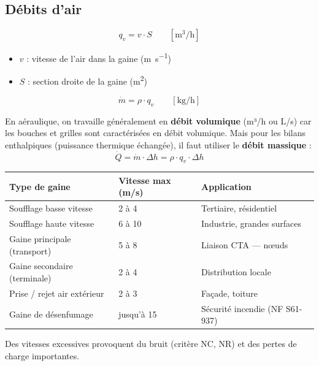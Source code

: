 \subsection{Débits d'air}

\begin{definition}[title=Débit volumique d'air]
\begin{equation}
  q_v = v \cdot S \qquad \left[\si{\cubic\metre\per\hour}\right]
\end{equation}
\begin{itemize}
  \item $v$ : vitesse de l'air dans la gaine (\si{\metre\per\second})
  \item $S$ : section droite de la gaine (\si{\square\metre})
\end{itemize}
\end{definition}

\begin{definition}[title=Débit massique d'air]
\begin{equation}
  \dot{m} = \rho \cdot q_v \qquad \left[\si{\kilogram\per\hour}\right]
\end{equation}
\end{definition}

\begin{attention}
En aéraulique, on travaille généralement en \textbf{débit volumique} (m³/h ou L/s) car les bouches et grilles sont caractérisées en débit volumique. Mais pour les bilans enthalpiques (puissance thermique échangée), il faut utiliser le \textbf{débit massique} :
\[
  \dot{Q} = \dot{m} \cdot \Delta h = \rho \cdot q_v \cdot \Delta h
\]
\end{attention}

\begin{methode}[title=Vitesses recommandées dans les gaines (NF EN 13779)]
\begin{center}
\begin{tabular}{lll}
  \toprule
  Type de gaine & Vitesse max (m/s) & Application \\
  \midrule
  Soufflage basse vitesse & 2 à 4 & Tertiaire, résidentiel \\
  Soufflage haute vitesse & 6 à 10 & Industrie, grandes surfaces \\
  Gaine principale (transport) & 5 à 8 & Liaison CTA — nœuds \\
  Gaine secondaire (terminale) & 2 à 4 & Distribution locale \\
  Prise / rejet air extérieur & 2 à 3 & Façade, toiture \\
  Gaine de désenfumage & jusqu'à 15 & Sécurité incendie (NF S61-937) \\
  \bottomrule
\end{tabular}
\end{center}
Des vitesses excessives provoquent du bruit (critère NC, NR) et des pertes de charge importantes.
\end{methode}

